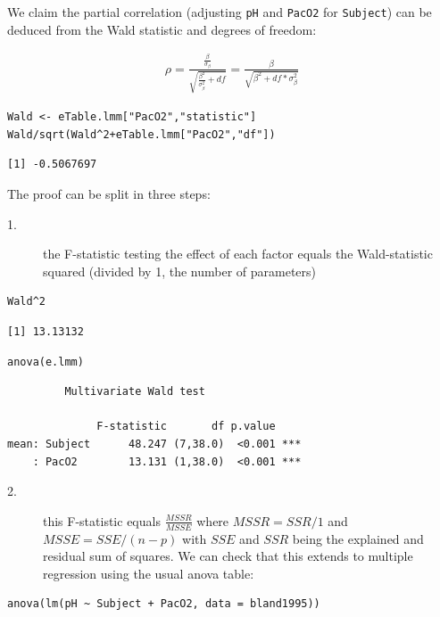 \documentclass[12pt]{article}
\begin{document}
We claim the partial correlation (adjusting \texttt{pH} and \texttt{PacO2} for
\texttt{Subject}) can be deduced from the Wald statistic and degrees of
freedom:

\begin{align}
\rho = \frac{\frac{\beta}{\sigma_{\beta}}}{\sqrt{\frac{\beta^2}{\sigma^2_{\beta}}+df}} = \frac{\beta}{\sqrt{\beta^2+df*\sigma_{\beta}^2}} \label{eq:pCor-formula}
\end{align}

\lstset{language=r,label= ,caption= ,captionpos=b,numbers=none}
\begin{lstlisting}
Wald <- eTable.lmm["PacO2","statistic"]
Wald/sqrt(Wald^2+eTable.lmm["PacO2","df"])
\end{lstlisting}

\begin{verbatim}
[1] -0.5067697
\end{verbatim}


The proof can be split in three steps:
\begin{description}
\item[{1.}] the F-statistic testing the effect of each factor equals the
Wald-statistic squared (divided by 1, the number of parameters)
\end{description}

\lstset{language=r,label= ,caption= ,captionpos=b,numbers=none}
\begin{lstlisting}
Wald^2
\end{lstlisting}

\begin{verbatim}
[1] 13.13132
\end{verbatim}


\lstset{language=r,label= ,caption= ,captionpos=b,numbers=none}
\begin{lstlisting}
anova(e.lmm)
\end{lstlisting}

\begin{verbatim}
	     Multivariate Wald test 

              F-statistic       df p.value    
mean: Subject      48.247 (7,38.0)  <0.001 ***
    : PacO2        13.131 (1,38.0)  <0.001 ***
\end{verbatim}


\begin{description}
\item[{2.}] this F-statistic equals \(\frac{MSSR}{MSSE}\) where \(MSSR =
  SSR/1\) and \(MSSE = SSE/(n-p)\) with \(SSE\) and \(SSR\) being the
explained and residual sum of squares. We can check that this
extends to multiple regression using the usual anova table:
\end{description}
\lstset{language=r,label= ,caption= ,captionpos=b,numbers=none}
\begin{lstlisting}
anova(lm(pH ~ Subject + PacO2, data = bland1995))
\end{lstlisting}
\end{document}
